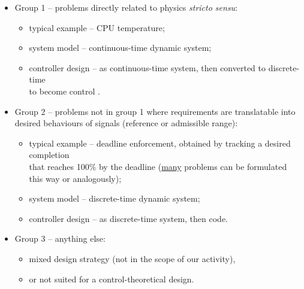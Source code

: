 \begin{frame}
\myPause
 \begin{itemize}[<+-| alert@+>]
 \item Group 1 -- problems directly related to physics \emph{stricto sensu}:
       \begin{itemize}[<+-| alert@+>]
       \item typical example -- CPU temperature;
       \item system model -- continuous-time dynamic system;
       \item controller design -- as continuous-time system, then converted to discrete-time\\
             to become control .
       \end{itemize}
 \item Group 2 -- problems not in group 1 where requirements are translatable into desired behaviours
       of signals (reference or admissible range):
       \begin{itemize}[<+-| alert@+>]
       \item typical example -- deadline enforcement, obtained by tracking a desired completion\\
             that reaches 100\% by the deadline (\underline{many} problems can be formulated\\
             this way or analogously);
       \item system model -- discrete-time dynamic system;
       \item controller design -- as discrete-time system, then code.
       \end{itemize}
 \item Group 3 -- anything else:
       \begin{itemize}[<+-| alert@+>]
       \item mixed design strategy (not in the scope of our activity),
       \item or not suited for a control-theoretical design.
       \end{itemize}
 \end{itemize}
\end{frame}

